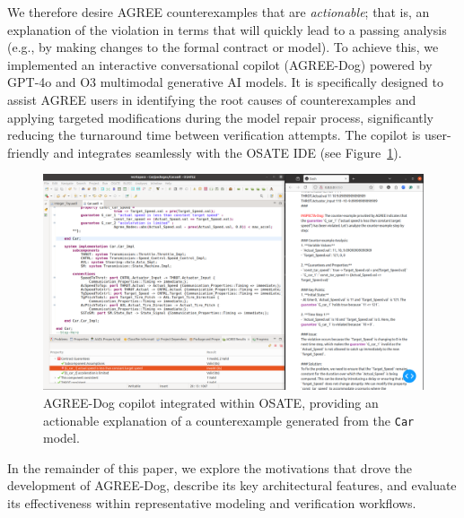 \label{sec:actionable}
We therefore desire AGREE counterexamples that are \textit{actionable}; that is, an explanation of the violation in terms that will quickly lead to a passing analysis (e.g., by making changes to the formal contract or model).
%
To achieve this, we implemented an interactive conversational copilot (AGREE-Dog) powered by GPT-4o and O3 multimodal generative AI models. It is specifically designed to assist AGREE users in identifying the root causes of counterexamples and applying targeted modifications during the model repair process, significantly reducing the turnaround time between verification attempts. The copilot is user-friendly and integrates seamlessly with the OSATE IDE (see Figure~\ref{fig:AGREEDOG}).

\begin{figure}[t]
\centering
\includegraphics[height=0.6\textwidth, width=1.0\textwidth]{AGREE-DOG-high-rs.png}
\caption{AGREE-Dog copilot integrated within OSATE, providing an actionable explanation of a counterexample generated from the \texttt{Car} model.}
\label{fig:AGREEDOG}
\end{figure}

In the remainder of this paper, we explore the motivations that drove the development of AGREE-Dog, describe its key architectural features, and evaluate its effectiveness within representative modeling and verification workflows.

